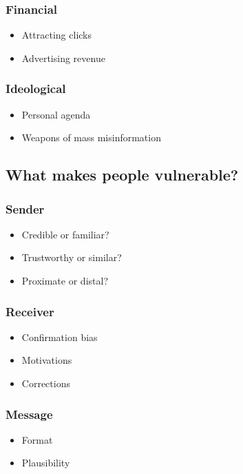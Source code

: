 \documentclass[11pt]{article}
\begin{document}
\subsubsection{Financial}
\label{sec:org545104e}
\begin{itemize}
\item Attracting clicks
\item Advertising revenue
\end{itemize}
\subsubsection{Ideological}
\label{sec:org5fe848b}
\begin{itemize}
\item Personal agenda
\item Weapons of mass misinformation
\end{itemize}
\subsection{What makes people vulnerable?}
\label{sec:org17898b6}

\subsubsection{Sender}
\label{sec:orga413afd}
\begin{itemize}
\item Credible or familiar?
\item Trustworthy or similar?
\item Proximate or distal?
\end{itemize}
\subsubsection{Receiver}
\label{sec:org54a7d07}
\begin{itemize}
\item Confirmation bias
\item Motivations
\item Corrections
\end{itemize}
\subsubsection{Message}
\label{sec:orgb43ddeb}
\begin{itemize}
\item Format
\item Plausibility
\end{itemize}
\end{document}

